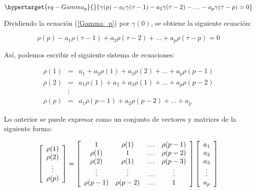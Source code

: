 \documentclass[
  a4paper,
]{article}
\begin{document}
\begin{equation}\protect\hypertarget{eq-Gamma_p}{}{
\gamma(p) - a_1 \gamma(\tau - 1) - a_2 \gamma(\tau - 2) - \ldots - a_p \gamma(\tau - p) = 0
}\label{eq-Gamma_p}\end{equation}

Dividiendo la ecuación (\ref{Gamma_p}) por \(\gamma(0)\), se obtiene la
siguiente ecuación:

\[
\rho(p) - a_1 \rho(\tau - 1) + a_2 \rho(\tau - 2) + \ldots + a_p \rho(\tau - p) = 0
\]

Así, podemos escribir el siguiente sistema de ecuaciones:

\begin{eqnarray}
    \rho(1) & = & a_1 + a_2 \rho(1) + a_3 \rho(2) + \ldots + a_p \rho(p-1) \nonumber \\
    \rho(2) & = & a_1 \rho(1) + a_2 + a_3 \rho(1) + \ldots + a_p \rho(p-2) \nonumber \\
    & \vdots & \nonumber \\
    \rho(p) & = & a_1 \rho(p-1) + a_2 \rho(p-2) + \ldots + a_p \nonumber
\end{eqnarray}

Lo anterior se puede expresar como un conjunto de vectores y matrices de
la siguiente forma:

\[
    \left[ 
    \begin{array}{c}
        \rho(1) \\
        \rho(2) \\
        \vdots \\
        \rho(p)
    \end{array} 
    \right]
    = 
    \left[ 
    \begin{array}{c c c c}
        1 & \rho(1) & \ldots & \rho(p - 1) \\
        \rho(1) & 1 & \ldots & \rho(p - 2) \\
        \rho(2) & \rho(1) & \ldots & \rho(p - 3) \\
        \vdots & \vdots & \ldots & \vdots \\
        \rho(p - 1) & \rho(p - 2) & \ldots & 1 \\
    \end{array} 
    \right]
    \left[ 
    \begin{array}{c}
        a_1 \\
        a_2 \\
        a_3 \\
        \vdots \\
        a_p \\
    \end{array} 
    \right]
\]
\end{document}
